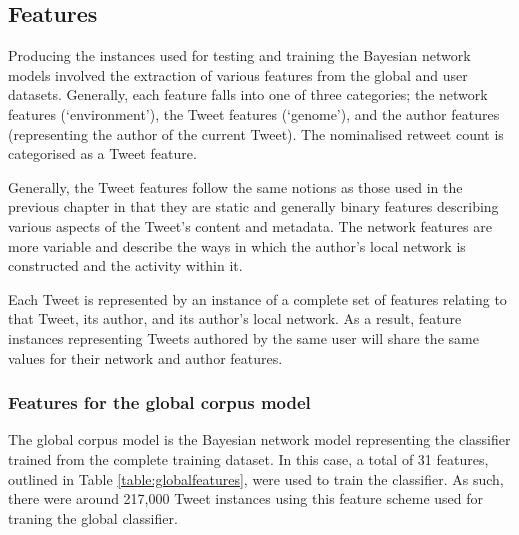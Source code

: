 


\subsection{Features}
Producing the instances used for testing and training the Bayesian network models involved the extraction of various features from the global and user datasets. Generally, each feature falls into one of three categories; the network features (`environment'), the Tweet features (`genome'), and the author features (representing the author of the current Tweet). The nominalised retweet count is categorised as a Tweet feature.

Generally, the Tweet features follow the same notions as those used in the previous chapter in that they are static and generally binary features describing various aspects of the Tweet's content and metadata. The network features are more variable and describe the ways in which the author's local network is constructed and the activity within it.

Each Tweet is represented by an instance of a complete set of features relating to that Tweet, its author, and its author's local network. As a result, feature instances representing Tweets authored by the same user will share the same values for their network and author features.


\subsubsection{Features for the global corpus model}
The global corpus model is the Bayesian network model representing the classifier trained from the complete training dataset. In this case, a total of 31 features, outlined in Table \ref{table:globalfeatures}, were used to train the classifier. As such, there were around 217,000 Tweet instances using this feature scheme used for traning the global classifier.

